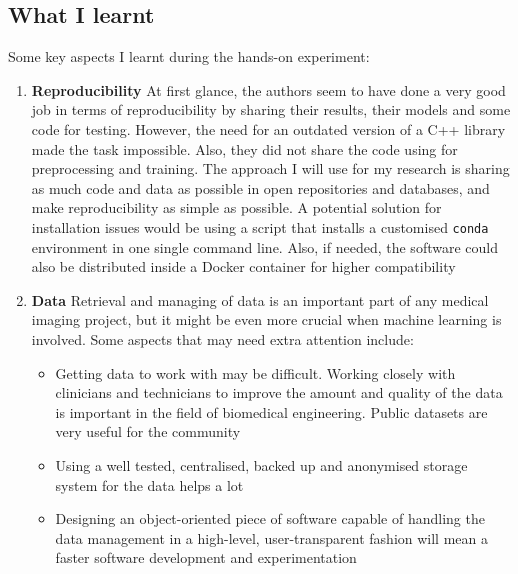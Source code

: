 \subsection{What I learnt}

Some key aspects I learnt during the hands-on experiment:
\begin{enumerate}
  \item \textbf{Reproducibility} At first glance, the authors seem to have done a very good job in terms of reproducibility by sharing their results, their models and some code for testing. However, the need for an outdated version of a C++ library made the task impossible. Also, they did not share the code using for preprocessing and training. The approach I will use for my research is sharing as much code and data as possible in open repositories and databases, and make reproducibility as simple as possible. A potential solution for installation issues would be using a script that installs a customised \texttt{conda} \cite{noauthor_conda_nodate} environment in one single command line. Also, if needed, the software could also be distributed inside a Docker container \cite{noauthor_docker_nodate} for higher compatibility

  \item \textbf{Data} Retrieval and managing of data is an important part of any medical imaging project, but it might be even more crucial when machine learning is involved. Some aspects that may need extra attention include:
    \begin{itemize}
      \item Getting data to work with may be difficult. Working closely with clinicians and technicians to improve the amount and quality of the data is important in the field of biomedical engineering. Public datasets are very useful for the community
      \item Using a well tested, centralised, backed up and anonymised storage system for the data helps a lot
      \item Designing an object-oriented piece of software capable of handling the data management in a high-level, user-transparent fashion will mean a faster software development and experimentation
    \end{itemize}


\end{enumerate}
